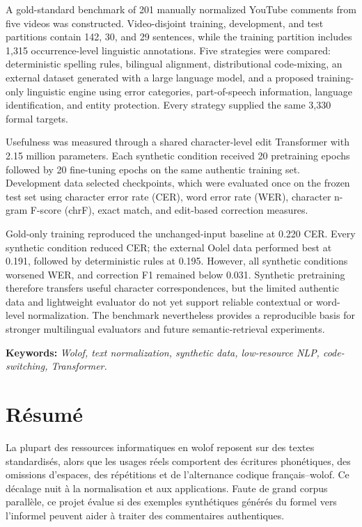 \documentclass[12pt, a4paper, twoside, openany]{report}
\begin{document}
A gold-standard benchmark of 201 manually normalized YouTube comments from five videos was constructed. Video-disjoint training, development, and test partitions contain 142, 30, and 29 sentences, while the training partition includes 1,315 occurrence-level linguistic annotations. Five strategies were compared: deterministic spelling rules, bilingual alignment, distributional code-mixing, an external dataset generated with a large language model, and a proposed training-only linguistic engine using error categories, part-of-speech information, language identification, and entity protection. Every strategy supplied the same 3,330 formal targets.

Usefulness was measured through a shared character-level edit Transformer with 2.15 million parameters. Each synthetic condition received 20 pretraining epochs followed by 20 fine-tuning epochs on the same authentic training set. Development data selected checkpoints, which were evaluated once on the frozen test set using character error rate (CER), word error rate (WER), character n-gram F-score (chrF), exact match, and edit-based correction measures.

Gold-only training reproduced the unchanged-input baseline at 0.220 CER. Every synthetic condition reduced CER; the external Oolel data performed best at 0.191, followed by deterministic rules at 0.195. However, all synthetic conditions worsened WER, and correction F1 remained below 0.031. Synthetic pretraining therefore transfers useful character correspondences, but the limited authentic data and lightweight evaluator do not yet support reliable contextual or word-level normalization. The benchmark nevertheless provides a reproducible basis for stronger multilingual evaluators and future semantic-retrieval experiments.

\medskip
\noindent\small\textbf{\color{aivancityNavy}Keywords:} \textit{\color{aivancityGray}Wolof, text normalization, synthetic data, low-resource NLP, code-switching, Transformer.}\normalsize

\medskip\medskip

\chapter*{R\'{e}sum\'{e}}
La plupart des ressources informatiques en wolof reposent sur des textes standardisés, alors que les usages réels comportent des écritures phonétiques, des omissions d'espaces, des répétitions et de l'alternance codique français--wolof. Ce décalage nuit à la normalisation et aux applications. Faute de grand corpus parallèle, ce projet évalue si des exemples synthétiques générés du formel vers l'informel peuvent aider à traiter des commentaires authentiques.
\end{document}
